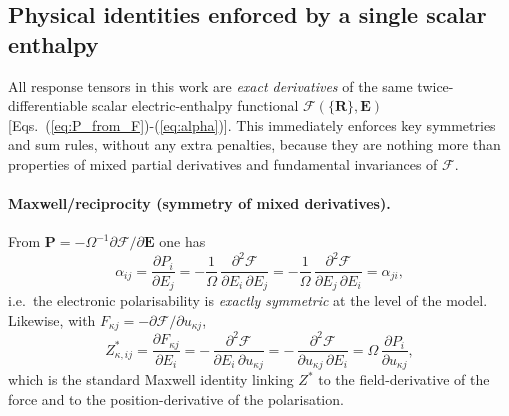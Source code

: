 \documentclass[aps,physrev,graphicx,amsmath,amssymb,
               reprint,superscriptaddress]{revtex4-2}
\begin{document}
\subsection{Physical identities enforced by a single scalar enthalpy}\label{sec:identities}
All response tensors in this work are \emph{exact derivatives} of the same twice-differentiable scalar electric-enthalpy functional $\mathcal F(\{\mathbf R\},\mathbf E)$ [Eqs.~(\ref{eq:P_from_F})-(\ref{eq:alpha})].
This immediately enforces key symmetries and sum rules, without any extra penalties, because they are nothing more than properties of mixed partial derivatives and fundamental invariances of $\mathcal F$.
\\

\paragraph*{Maxwell/reciprocity (symmetry of mixed derivatives).}
From $\mathbf P = -\Omega^{-1}\partial \mathcal F/\partial \mathbf E$ one has
\begin{equation}
\alpha_{ij}
= \frac{\partial P_i}{\partial E_j}
= -\frac{1}{\Omega}\,\frac{\partial^2 \mathcal F}{\partial E_i\,\partial E_j}
= -\frac{1}{\Omega}\,\frac{\partial^2 \mathcal F}{\partial E_j\,\partial E_i}
= \alpha_{ji},
\label{eq:maxwell-alpha}
\end{equation}
i.e.\ the electronic polarisability is \emph{exactly symmetric} at the level of the model.
Likewise, with $F_{\kappa j}=-\partial \mathcal F/\partial u_{\kappa j}$,
\begin{equation}
Z^*_{\kappa,ij}
=\frac{\partial F_{\kappa j}}{\partial E_i}
= -\,\frac{\partial^2 \mathcal F}{\partial E_i\,\partial u_{\kappa j}}
= -\,\frac{\partial^2 \mathcal F}{\partial u_{\kappa j}\,\partial E_i}
=\Omega\,\frac{\partial P_i}{\partial u_{\kappa j}},
\label{eq:maxwell-zstar}
\end{equation}
which is the standard Maxwell identity linking $Z^*$ to the field-derivative of the force and to the position-derivative of the polarisation.
\\ 
\end{document}
